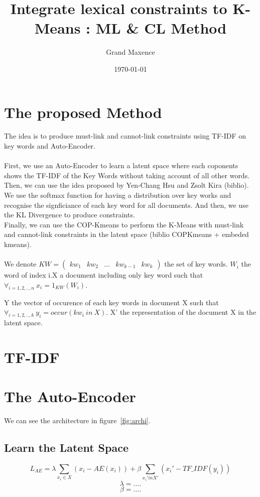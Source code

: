 \documentclass{article}
\title{Integrate lexical constraints to K-Means : ML \& CL Method}
\author{Grand Maxence}
\date{\today}
\begin{document}
\maketitle
\justify

\section{The proposed Method}

The idea is to produce must-link and cannot-link constraints using TF-IDF on key
words and Auto-Encoder.\\ \\
First, we use an Auto-Encoder to learn a latent space where each coponents shows
the TF-IDF of the Key Words without taking account of all other words.
\\Then, we can use the idea proposed by Yen-Chang Hsu and Zsolt Kira (biblio).
We use the softmax function for having a distribution over key works and
recognise the signficiance of each key word for all documents. And then, we use
the KL Divergence to produce constraints.\\
Finally, we can use the COP-Kmeans to perform the K-Means with must-link and
cannot-link constraints in the latent space (biblio COPKmeans + embeded kmeans).
\\ \\
We denote
$KW = \begin{pmatrix} kw_1 & kw_2 & ... & kw_{k-1} & kw_{k} \end {pmatrix}$
the set of key words. $W_i$ the word of index i.X a document including only
key word such that $\forall_{i = 1,2,..,n}~x_i = 1_{KW}(W_i)$.

Y the vector of occurence of each key words in document X such that
$\forall_{i=1, 2, .., k}~y_i = occur(kw_i~in~X)$. X' the representation of the
document X in the latent space.
\section{TF-IDF}

\section{The Auto-Encoder}

We can see the architecture in figure~\ref{fig:archi}.

\subsection{Learn the Latent Space}
\begin{equation}\label{eq:loss_AE}
  L_{AE}= \lambda\sum_{x_i \in X} (x_i - AE(x_i)) +
  \beta\sum_{x_i' in X'} (x_i' - TF\_IDF(y_i))
\end{equation}
\begin{equation}\label{eq:lambda}
  \lambda = ....
\end{equation}
\begin{equation}\label{eq:beta}
  \beta = ....
\end{equation}
\end{document}
